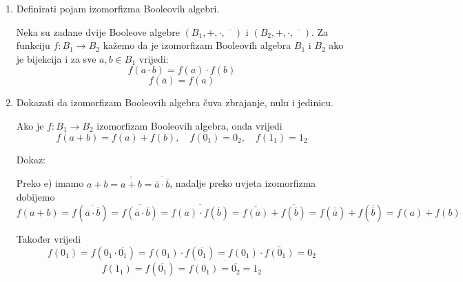 \documentclass{article}
\begin{document}
\begin{enumerate}
\item Definirati pojam izomorfizma Booleovih algebri.

Neka su zadane dvije Booleove algebre $(B_1, +, \cdot, \overline{\phantom{m}})$ i $(B_2, +, \cdot, \overline{\phantom{m}})$. Za funkciju $f: B_1\rightarrow B_2$ kažemo da je izomorfizam Booleovih algebra $B_1$ i $B_2$ ako je bijekcija i za sve $a, b\in B_1$ vrijedi:
$$f(a\cdot b) = f(a)\cdot f(b)$$
$$f(\overline{a}) = f(a)$$

\item Dokazati da izomorfizam Booleovih algebra čuva zbrajanje, nulu i jedinicu.

Ako je $f: B_1\rightarrow B_2$ izomorfizam Booleovih algebra, onda vrijedi
$$f(a+b) = f(a) + f(b),\quad f(0_1) = 0_2, \quad f(1_1) = 1_2$$

Dokaz:

Preko e) imamo $a + b = \overline{\overline{a + b}} = \overline{\overline{a}\cdot\overline{b}}$, nadalje preko uvjeta izomorfizma dobijemo
$$f(a+b) = f(\overline{\overline{a}\cdot\overline{b}}) = \overline{f(\overline{a}\cdot\overline{b})} = \overline{f(\overline{a})\cdot f(\overline{b})} = \overline{f(\overline{a})} + \overline{f(\overline{b})} = f(\overline{\overline{a}}) + f(\overline{\overline{b}}) = f(a) + f(b)$$

Također vrijedi $$f(0_1) = f(0_1\cdot\overline{0_1}) = f(0_1)\cdot f(\overline{0_1}) = f(0_1)\cdot \overline{f(0_1)} = 0_2$$
$$f(1_1) = f(\overline{0_1}) = \overline{f(0_1) = \overline{0_2} = 1_2}$$

\end{enumerate}
\end{document}
